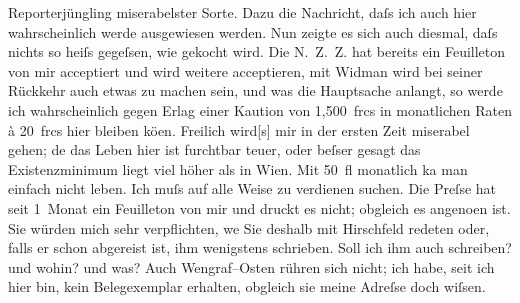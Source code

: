 \begin{ledgroupsized}[t]{13cm}
                    Reporterjüngling miserabelster Sorte. Dazu die Nachricht, daſs ich auch hier
                    wahrscheinlich werde ausgewiesen werden. Nun zeigte es sich auch diesmal, daſs
                    nichts so heiſs gegeſsen, wie gekocht wird. Die N. Z. Z. hat bereits ein Feuilleton von mir acceptiert und wird
                    weitere acceptieren, mit Widman wird bei
                    seiner Rückkehr auch etwas zu machen sein, und was die Hauptsache anlangt, so
                    werde ich wahrscheinlich gegen Erlag einer Kaution von 1,500 frcs in monatlichen
                    Raten à 20 frcs hier bleiben kö{\geminationn}en. Freilich
                    wird{[}s{]} mir in {\pb}der ersten Zeit miserabel gehen; de{\geminationn} das Leben
                    hier ist furchtbar teuer, oder beſser gesagt das Existenzminimum liegt viel
                    höher als in Wien. Mit 50 fl monatlich ka{\geminationn} man einfach nicht leben. Ich muſs auf alle Weise
                    zu verdienen suchen. Die Preſse hat seit
                    1 Monat ein Feuilleton von
                    mir und druckt es nicht; obgleich es angeno{\geminationm}en ist.
                    Sie würden mich sehr verpflichten, we{\geminationn} Sie deshalb
                    mit Hirschfeld redeten oder, falls er schon
                    abgereist ist, ihm wenigstens schrieben. Soll ich ihm auch schreiben? und wohin?
                    und was? Auch Wengraf–Osten rühren sich nicht; ich habe, seit ich hier bin,
                    kein Belegexemplar erhalten, obgleich sie meine Adreſse doch wiſsen.\pend

\end{ledgroupsized}
